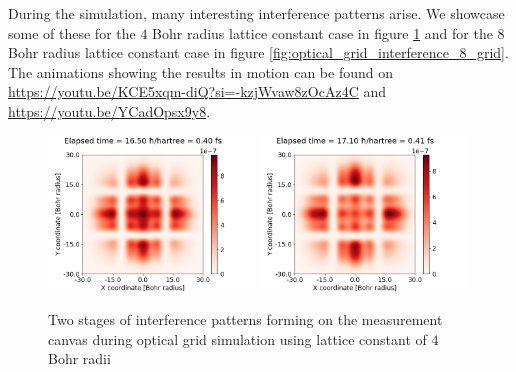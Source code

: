 During the simulation, many interesting interference patterns arise.
We showcase some of these for the $4$ Bohr radius lattice constant case in figure \ref{fig:optical_grid_interference} and for the $8$ Bohr radius lattice constant case in figure \ref{fig:optical_grid_interference_8_grid}.
The animations showing the results in motion can be found on \url{https://youtu.be/KCE5xqm-diQ?si=-kzjWvaw8zOcAz4C} and \url{https://youtu.be/YCadOpsx9y8}.
\begin{figure}
	\begin{center}
		\includegraphics[width=0.49\textwidth]{figures/optical_grid_interference_01.png}
		\includegraphics[width=0.49\textwidth]{figures/optical_grid_interference_02.png}
		\caption{Two stages of interference patterns forming on the measurement canvas during optical grid simulation using lattice constant of $4$ Bohr radii}
		\label{fig:optical_grid_interference}
	\end{center}	
\end{figure}
